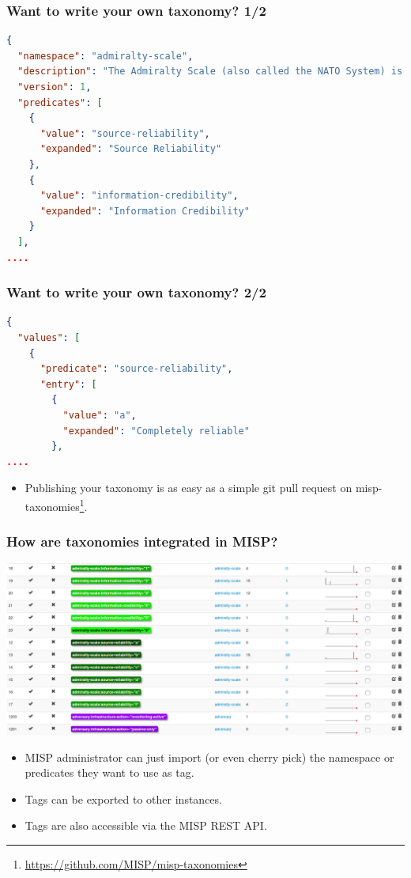 \begin{frame}[fragile]
\frametitle{Want to write your own taxonomy? 1/2}
\begin{lstlisting}[language=json,firstnumber=1]
{
  "namespace": "admiralty-scale",
  "description": "The Admiralty Scale (also called the NATO System) is used to rank the reliability of a source and the credibility of an information.",
  "version": 1,
  "predicates": [
    {
      "value": "source-reliability",
      "expanded": "Source Reliability"
    },
    {
      "value": "information-credibility",
      "expanded": "Information Credibility"
    }
  ],
....
\end{lstlisting}
\end{frame}

\begin{frame}[fragile]
\frametitle{Want to write your own taxonomy? 2/2}
\begin{lstlisting}[language=json,firstnumber=1]
{
  "values": [
    {
      "predicate": "source-reliability",
      "entry": [
        {
          "value": "a",
          "expanded": "Completely reliable"
        },
....
\end{lstlisting}
\begin{itemize}
        \item Publishing your taxonomy is as easy as a simple git pull request on misp-taxonomies\footnote{\url{https://github.com/MISP/misp-taxonomies}}.
\end{itemize}
\end{frame}

\begin{frame}
\frametitle{How are taxonomies integrated in MISP?}
        \includegraphics[scale=0.21]{tags-2-4-70.png}
\begin{itemize}
        \item MISP administrator can just import (or even cherry pick) the namespace or predicates they want to use as tag.
\item Tags can be exported to other instances.
\item Tags are also accessible via the MISP REST API.
\end{itemize}
\end{frame}



